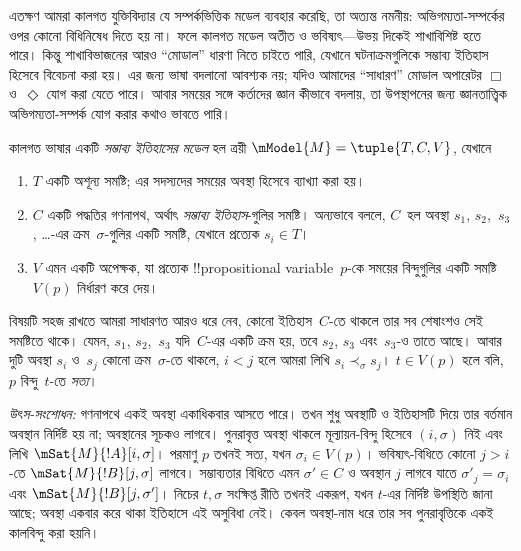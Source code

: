 \documentclass[../../../include/open-logic-section]{subfiles}
\begin{document}


এতক্ষণ আমরা কালগত যুক্তিবিদ্যার যে সম্পর্কভিত্তিক মডেল ব্যবহার করেছি, তা অত্যন্ত নমনীয়: অভিগম্যতা-সম্পর্কের ওপর কোনো বিধিনিষেধ দিতে হয় না। ফলে কালগত মডেল অতীত ও ভবিষ্যৎ—উভয় দিকেই শাখাবিশিষ্ট হতে পারে। কিন্তু শাখাবিভাজনের আরও ``মোডাল'' ধারণা নিতে চাইতে পারি, যেখানে ঘটনাক্রমগুলিকে সম্ভাব্য ইতিহাস হিসেবে বিবেচনা করা হয়। এর জন্য ভাষা বদলানো আবশ্যক নয়; যদিও আমাদের ``সাধারণ'' মোডাল অপারেটর $\Box$ ও~$\Diamond$ যোগ করা যেতে পারে। আবার সময়ের সঙ্গে কর্তাদের জ্ঞান কীভাবে বদলায়, তা উপস্থাপনের জন্য জ্ঞানতাত্ত্বিক অভিগম্যতা-সম্পর্ক যোগ করার কথাও ভাবতে পারি।

\begin{defn}
  কালগত ভাষার একটি \emph{সম্ভাব্য ইতিহাসের মডেল} হল ত্রয়ী
  $\mModel{M} = \tuple{T, C, V}$, যেখানে
  \begin{enumerate}
    \item $T$ একটি অশূন্য সমষ্টি; এর সদস্যদের সময়ের অবস্থা হিসেবে ব্যাখ্যা করা হয়।
    \item $C$ একটি পদ্ধতির গণনাপথ, অর্থাৎ \emph{সম্ভাব্য ইতিহাস}-গুলির সমষ্টি। অন্যভাবে বললে, $C$~হল অবস্থা $s_1$, $s_2$,~$s_3$, \dots-এর ক্রম~$\sigma$-গুলির একটি সমষ্টি, যেখানে প্রত্যেক $s_i \in T$।
    \item $V$ এমন একটি অপেক্ষক, যা প্রত্যেক !!{propositional
      variable}~$p$-কে সময়ের বিন্দুগুলির একটি সমষ্টি~$V(p)$ নির্ধারণ করে দেয়।
  \end{enumerate}
  বিষয়টি সহজ রাখতে আমরা সাধারণত আরও ধরে নেব, কোনো ইতিহাস~$C$-তে থাকলে তার সব শেষাংশও সেই সমষ্টিতে থাকে। যেমন, $s_1$, $s_2$,~$s_3$ যদি~$C$-এর একটি ক্রম হয়, তবে $s_2$, $s_3$ এবং~$s_3$-ও তাতে আছে। আবার দুটি অবস্থা $s_i$ ও~$s_j$ কোনো ক্রম~$\sigma$-তে থাকলে, $i < j$ হলে আমরা লিখি $s_i \prec_\sigma s_j$। $t \in V(p)$ হলে বলি, $p$ বিন্দু~$t$-তে \emph{সত্য}।
\end{defn}
\emph{উৎস-সংশোধন:} গণনাপথে একই অবস্থা একাধিকবার আসতে পারে। তখন শুধু অবস্থাটি ও ইতিহাসটি দিয়ে তার বর্তমান অবস্থান নির্দিষ্ট হয় না; অবস্থানের সূচকও লাগবে। পুনরাবৃত্ত অবস্থা থাকলে মূল্যায়ন-বিন্দু হিসেবে $(i,\sigma)$ নিই এবং লিখি $\mSat{M}{!A}[i,\sigma]$। পরমাণু $p$ তখনই সত্য, যখন $\sigma_i\in V(p)$। ভবিষ্যৎ-বিধিতে কোনো $j>i$-তে $\mSat{M}{!B}[j,\sigma]$ লাগবে। সম্ভাব্যতার বিধিতে এমন $\sigma'\in C$ ও অবস্থান $j$ লাগবে যাতে $\sigma'_j=\sigma_i$ এবং $\mSat{M}{!B}[j,\sigma']$। নিচের $t,\sigma$ সংক্ষিপ্ত রীতি তখনই একরূপ, যখন $t$-এর নির্দিষ্ট উপস্থিতি জানা আছে; অবস্থা একবার করে থাকা ইতিহাসে এই অসুবিধা নেই। কেবল অবস্থা-নাম ধরে তার সব পুনরাবৃত্তিকে একই কালবিন্দু করা হয়নি।
\end{document}
